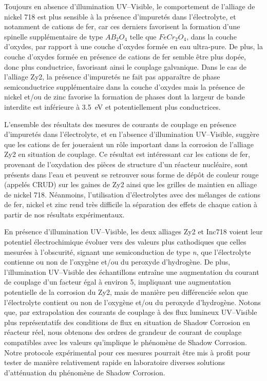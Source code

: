 \begin{refsection}
    Toujours en absence d’illumination UV--Visible, le comportement de l’alliage de nickel 718 est plus sensible à la
    présence d’impuretés dans l’électrolyte, et notamment de cations de fer, car ces derniers favorisent la formation d’une
    spinelle supplémentaire de type $AB_2O_4$ telle que $FeCr_2O_4$, dans la couche d’oxydes, par rapport à une couche d’oxydes
    formée en eau ultra-pure. De plus, la couche d’oxydes formée en présence de cations de fer semble être plus dopée, donc
    plus conductrice, favorisant ainsi le couplage galvanique. Dans le cas de l’alliage Zy2, la présence d’impuretés ne fait
    pas apparaître de phase semiconductrice supplémentaire dans la couche d’oxydes mais la présence de nickel et/ou de zinc
    favorise la formation de phases dont la largeur de bande interdite est inférieure à 3.5~eV et potentiellement  plus
    conductrices.

    L’ensemble des résultats des mesures de courants de couplage en présence d’impuretés dans l’électrolyte, et en l’absence
    d’illumination UV--Visible, suggère que les cations de fer joueraient un rôle important dans la corrosion de l’alliage
    Zy2 en situation de couplage. Ce résultat est intéressant car les cations de fer, provenant de l’oxydation des pièces de
    structure d’un réacteur nucléaire, sont présents dans l’eau et peuvent se retrouver sous forme de dépôt de couleur rouge
    (appelés CRUD) sur les gaines de Zy2 ainsi que les grilles de maintien en alliage de nickel 718. Néanmoins,
    l’utilisation d’électrolytes avec des mélanges de cations de fer, nickel et zinc rend très difficile la séparation des
    effets de chaque cation à partir de nos résultats expérimentaux. 

    En présence d’illumination UV--Visible, les deux alliages Zy2 et Inc718 voient leur potentiel électrochimique évoluer
    vers des valeurs plus cathodiques que celles mesurées à l’obscurité, signant une semiconduction de type \emph{n}, que
    l’électrolyte contienne ou non de l’oxygène et/ou  du peroxyde d’hydrogène. De plus, l’illumination UV--Visible des
    échantillons entraîne une augmentation du courant de couplage d’un facteur égal à environ 5, impliquant une augmentation
    potentielle de la corrosion du Zy2, mais de manière peu différenciée selon que l’électrolyte contient ou non de
    l’oxygène et/ou  du peroxyde d’hydrogène. Notons que, par extrapolation des courants de couplage à des flux lumineux
    UV--Visible plus représentatifs des conditions de flux en situation de Shadow Corrosion en réacteur réel, nous obtenons
    des ordres de grandeur de courant de couplage compatibles avec les valeurs qu’implique le phénomène de Shadow Corrosion.
    Notre protocole expérimental pour ces mesures pourrait être mis à profit pour tester de manière relativement rapide en
    laboratoire diverses solutions d’atténuation du phénomène de Shadow Corrosion.



\end{refsection}
